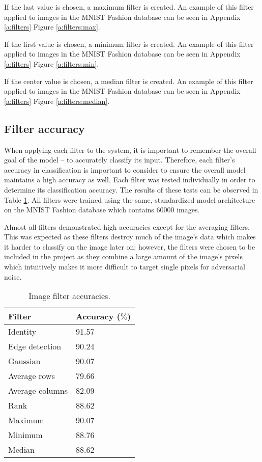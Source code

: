 			If the last value is chosen, a maximum filter is created. An example of this filter applied to images in the MNIST Fashion database \cite{zalandoresearchFashionMNIST} can be seen in Appendix \ref{a:filters} Figure \ref{a:filters:max}.

			If the first value is chosen, a minimum filter is created. An example of this filter applied to images in the MNIST Fashion database \cite{zalandoresearchFashionMNIST} can be seen in Appendix \ref{a:filters} Figure \ref{a:filters:min}.

			If the center value is chosen, a median filter is created. An example of this filter applied to images in the MNIST Fashion database \cite{zalandoresearchFashionMNIST} can be seen in Appendix \ref{a:filters} Figure \ref{a:filters:median}.

	\subsection{Filter accuracy} \label{s:filters:accuracy}
		When applying each filter to the system, it is important to remember the overall goal of the model -- to accurately classify its input. Therefore, each filter's accuracy in classification is important to consider to ensure the overall model maintains a high accuracy as well. Each filter was tested individually in order to determine its classification accuracy. The results of these tests can be observed in Table \ref{t:filterAccuracies}. All filters were trained using the same, standardized model architecture on the MNIST Fashion database \cite{zalandoresearchFashionMNIST} which contains \(60000\) images.

		Almost all filters demonstrated high accuracies except for the averaging filters. This was expected as these filters destroy much of the image's data which makes it harder to classify on the image later on; however, the filters were chosen to be included in the project as they combine a large amount of the image's pixels which intuitively makes it more difficult to target single pixels for adversarial noise.
		\begin{table}
			\begin{center}
				\caption{Image filter accuracies.}
				\label{t:filterAccuracies}
				\begin{tabular}{l|l}\hline
					\textbf{Filter} & \textbf{Accuracy (\(\%\))}\\\hline
					Identity & 91.57\\\hline
					Edge detection & 90.24\\\hline
					Gaussian & 90.07\\\hline
					Average rows & 79.66\\\hline
					Average columns & 82.09\\\hline
					Rank & 88.62\\\hline
					Maximum & 90.07\\\hline
					Minimum & 88.76\\\hline
					Median & 88.62\\\hline
				\end{tabular}
			\end{center}
		\end{table}

